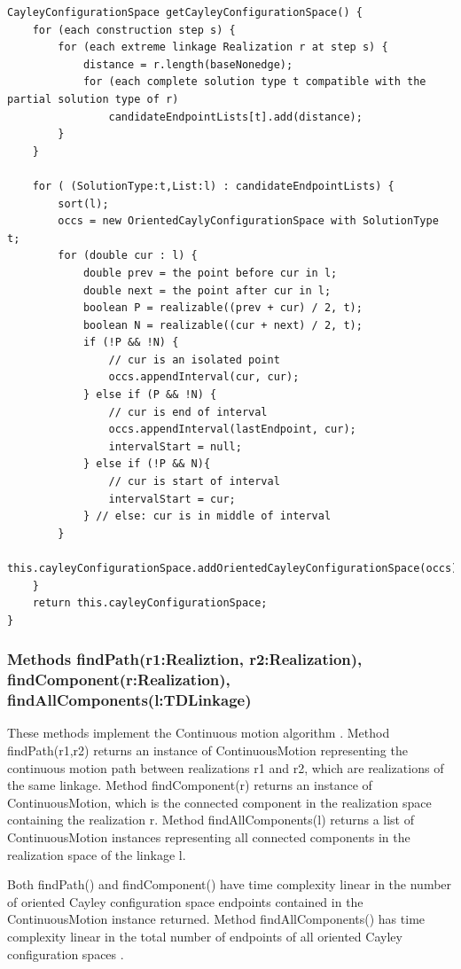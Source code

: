 \documentclass[10pt]{article}
\begin{document}
\begin{lstlisting}[mathescape]
CayleyConfigurationSpace getCayleyConfigurationSpace() {
	for (each construction step s) {
		for (each extreme linkage Realization r at step s) {
			distance = r.length(baseNonedge);
			for (each complete solution type t compatible with the partial solution type of r) 
				candidateEndpointLists[t].add(distance);
		}
	}
	
	for ( (SolutionType:t,List:l) : candidateEndpointLists) {
		sort(l);
		occs = new OrientedCaylyConfigurationSpace with SolutionType t;
		for (double cur : l) {
			double prev = the point before cur in l;
			double next = the point after cur in l;
			boolean P = realizable((prev + cur) / 2, t);
			boolean N = realizable((cur + next) / 2, t);
			if (!P && !N) {
				// cur is an isolated point
				occs.appendInterval(cur, cur); 
			} else if (P && !N) {
				// cur is end of interval
				occs.appendInterval(lastEndpoint, cur); 
				intervalStart = null;
			} else if (!P && N){
				// cur is start of interval
				intervalStart = cur; 
			} // else: cur is in middle of interval
		}
		this.cayleyConfigurationSpace.addOrientedCayleyConfigurationSpace(occs);
	}
	return this.cayleyConfigurationSpace;
}
\end{lstlisting}


\subsubsection{Methods \textsf{findPath(r1:Realiztion, r2:Realization)}, \textsf{findComponent(r:Realization)}, \textsf{findAllComponents(l:TDLinkage)} } \label{sec:findpath}
These methods implement the Continuous motion algorithm \cite[Theorem 3]{Sitharam2011a}. %
%
%
Method \textsf{findPath(r1,r2)} 
returns an instance of \textsf{ContinuousMotion}
representing the continuous motion path between realizations \textsf{r1} and \textsf{r2}, 
which are realizations of the same linkage. 
Method \textsf{findComponent(r)} returns an instance of \textsf{ContinuousMotion}, 
which is the connected component in the realization space containing the realization \textsf{r}. 
Method \textsf{findAllComponents(l)}
returns a list of \textsf{ContinuousMotion} instances representing all connected components in the realization space of the linkage \textsf{l}. 

Both \textsf{findPath()} and \textsf{findComponent()}  %
have time complexity linear in the number of oriented Cayley configuration space endpoints contained in the 
\textsf{ContinuousMotion} instance returned. 
Method \textsf{findAllComponents()} %
has time complexity linear in the total number of endpoints of all oriented Cayley configuration spaces \cite[Theorem 3]{sitharam2014beast}. 
\end{document}

